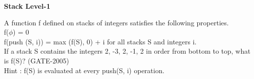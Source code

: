 
\centerline{\textbf{ \LARGE Stack Level-1}}


\begin{questyle}

  \question  A function f defined on stacks of integers satisfies the following properties. \\
             f(\(\phi\)) = 0  \\
             f(push (S, i)) = max (f(S), 0) + i for all stacks S and integers i. \\
             If a stack S contains the integers 2, -3, 2, -1, 2 in order from bottom to top, what is f(S)?  (GATE-2005)\\
             Hint : f(S) is evaluated at every push(S, i) operation.\\
  \begin{oneparchoices}
  \end{oneparchoices}

\end{questyle}

